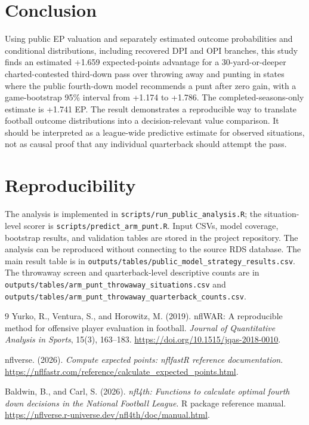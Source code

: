 \documentclass[11pt]{article}
\begin{document}
\section{Conclusion}

Using public EP valuation and separately estimated outcome probabilities and conditional distributions, including recovered DPI and OPI branches, this study finds an estimated +1.659 expected-points advantage for a 30-yard-or-deeper charted-contested third-down pass over throwing away and punting in states where the public fourth-down model recommends a punt after zero gain, with a game-bootstrap 95\% interval from +1.174 to +1.786. The completed-seasons-only estimate is +1.741 EP. The result demonstrates a reproducible way to translate football outcome distributions into a decision-relevant value comparison. It should be interpreted as a league-wide predictive estimate for observed situations, not as causal proof that any individual quarterback should attempt the pass.

\section*{Reproducibility}

The analysis is implemented in \texttt{scripts/run\_public\_analysis.R}; the situation-level scorer is \texttt{scripts/predict\_arm\_punt.R}. Input CSVs, model coverage, bootstrap results, and validation tables are stored in the project repository. The analysis can be reproduced without connecting to the source RDS database. The main result table is in \texttt{outputs/tables/public\_model\_strategy\_results.csv}. The throwaway screen and quarterback-level descriptive counts are in \texttt{outputs/tables/arm\_punt\_throwaway\_situations.csv} and \texttt{outputs/tables/arm\_punt\_throwaway\_quarterback\_counts.csv}.

\begin{thebibliography}{9}
Yurko, R., Ventura, S., and Horowitz, M. (2019). nflWAR: A reproducible method for offensive player evaluation in football. \textit{Journal of Quantitative Analysis in Sports}, 15(3), 163--183. \url{https://doi.org/10.1515/jqas-2018-0010}.

nflverse. (2026). \textit{Compute expected points: nflfastR reference documentation}. \url{https://nflfastr.com/reference/calculate_expected_points.html}.

Baldwin, B., and Carl, S. (2026). \textit{nfl4th: Functions to calculate optimal fourth down decisions in the National Football League}. R package reference manual. \url{https://nflverse.r-universe.dev/nfl4th/doc/manual.html}.
\end{thebibliography}
\end{document}
